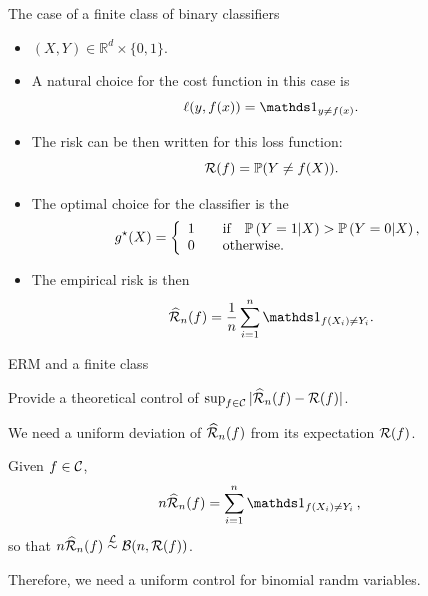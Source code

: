\documentclass[xcolor={usenames,dvipsnames},handout]{beamer}
\begin{document}
\begin{frame}{The case of a finite class of binary classifiers}

\begin{itemize}
\item $(X,Y)\in \mathbb{R}^d\times\{0,1\}$.
\item A natural choice for the cost function in this case is
$$
\ell(y,f(x)) = \one_{y\neq f(x)}.
$$
\item  The risk can be then written for this loss function:
\pause
$$
{\mathcal{R}}(f) = \mathbb{P}(Y\neq f(X)).
$$
\item The optimal choice for the classifier is the 
\pause
$$
g^{\star}(X) =
\left\{
	\begin{array}{cc}
		1 &\quad \text{if} \quad \P \left( Y=1 | X \right) > \P \left( Y=0 | X \right), \\
		0 &\quad \text{otherwise}. \hfill
	\end{array}
\right.
$$
\item The empirical risk is then
$$
\widehat{\Rc}_n(f) = \frac{1}{n} \sum_{i=1}^n \one_{f(X_i) \neq Y_i}.
$$
\end{itemize}
\end{frame}




\begin{frame}{ERM and a finite class}

  Provide a theoretical control of $\sup_{f\in \mathcal{C}} | \widehat{{\mathcal{R}}}_n(f) - {\mathcal{R}}(f) |$.

\vspace{.4cm}

We need a \alert{uniform deviation of $\widehat{{\mathcal{R}}}_n(f)$ from its expectation ${\mathcal{R}}(f)$}.

\vspace{.4cm}

Given $f\in \mathcal{C}$, 
$$
n \widehat{\Rc}_n(f) =  \sum_{i=1}^n \one_{f(X_i) \neq Y_i}\,,
$$
so that \alert{$n \widehat{{\mathcal{R}}}_n(f) \overset{{\mathcal{L}}}{\sim} {\mathcal{B}} (n, {\mathcal{R}}(f) )$}.

\vspace{.4cm}

Therefore, we need  a uniform control for binomial randm variables.
\end{frame}
\end{document}
